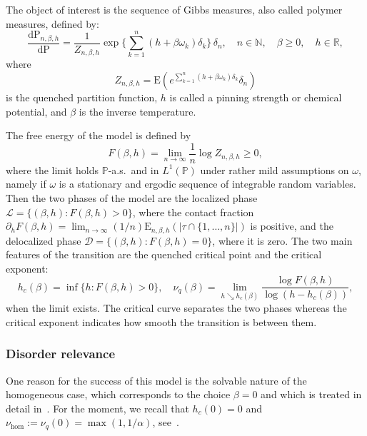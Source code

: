 \documentclass[AHL,Unicode,longabstracts]{cedram}
\newcommand{\bbN}{{\ensuremath{\mathbb N}}}
\newcommand{\bbP}{{\ensuremath{\mathbb P}}}
\newcommand{\bbR}{{\ensuremath{\mathbb R}}}
\newcommand{\cD}{{\ensuremath{\mathcal D}}}
\newcommand{\cL}{{\ensuremath{\mathcal L}}}
\newcommand{\ga}{\alpha}
\newcommand{\gb}{\beta}
\newcommand{\gd}{\delta}
\newcommand{\go}{\omega}
\newcommand{\dd}{\mathrm{d}}
\newcommand\bP{\ensuremath{\mathrm{P}}}
\newcommand\bE{\ensuremath{\mathrm{E}}}
\begin{document}
The object of interest is the sequence of Gibbs measures, also called polymer measures, defined by:
\begin{equation}\label{eq:defquemeas}
\frac{\dd \bP_{n,\gb,h}}{\dd \bP} = \frac{1}{Z_{n,\gb,h}} \exp \bigg\{\sum_{k=1}^n (h + \gb \go_k)\gd_k \bigg\} \,\gd_n, \quad n \in \bbN, \quad \gb \geq 0, \quad h \in \bbR,
\end{equation}
where
\begin{equation}\label{eq:defquepf}
Z_{n,\gb,h} = \bE \left(e^{\sum_{k=1}^n (h + \gb \go_k) \gd_k} \gd_n \right)
\end{equation}
is the quenched partition function, $h$ is called a pinning strength or chemical potential, and $\gb$ is the inverse temperature.

The free energy of the model is defined by
\begin{equation}
F(\gb,h) = \lim_{n \to \infty} \frac{1}{n} \log Z_{n,\gb,h} \geq 0,
\end{equation}
where the limit holds $\bbP$-a.s.~and in $L^1(\bbP)$ under rather mild assumptions on $\go$, namely if $\go$ is a stationary and ergodic sequence of integrable random variables. Then the two phases of the model are the localized phase $\cL = \{(\gb, h): F(\gb, h)>0\}$, where the contact fraction $\partial_h F(\gb,h) = \lim_{n \to \infty} (1/n) \bE_{n,\gb,h}(|\tau \cap \{1,\ldots,n\}|)$ is positive, and the delocalized phase $\cD = \{(\gb, h): F(\gb, h)=0\}$, where it is zero. The two main features of the transition are the quenched critical point and the critical exponent:
\begin{equation}
h_c(\gb) = \inf\{h \colon F(\gb,h) > 0\},\quad \nu_q(\gb) = \lim_{h \searrow h_c(\gb)} \frac{\log F(\gb,h)}{\log (h - h_c(\gb))},
\end{equation}
when the limit exists. The critical curve separates the two phases whereas the critical exponent indicates how smooth the transition is between them.

\subsubsection{Disorder relevance}

One reason for the success of this model is the solvable nature of the homogeneous case, which corresponds to the choice $\gb = 0$ and which is treated in detail in~\cite{Gi2007}. For the moment, we recall that $h_c(0) = 0$ and $\nu_{\hom}:= \nu_q(0) = \max(1,1/\ga)$, see~\cite[Theorem~2.1]{Gi2007}.
\end{document}
